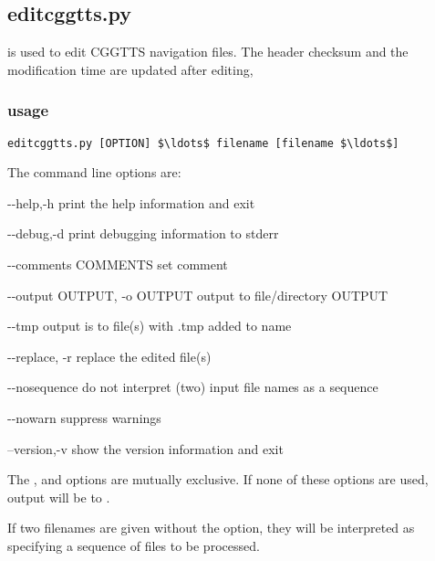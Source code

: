 \subsection{editcggtts.py}

\hypertarget{h:editcggtts}{}

 is used to edit CGGTTS navigation files. 
The header checksum and the modification time are updated after editing, 

\subsubsection{usage}

\begin{lstlisting}[mathescape=true]
editcggtts.py [OPTION] $\ldots$ filename [filename $\ldots$]
\end{lstlisting}
The command line options are:
\begin{description*}
	\item[-{}-help,-h]	print the help information and exit
	\item[-{}-debug,-d]	print debugging information to stderr
	\item[-{}-comments COMMENTS]   set comment
  \item[-{}-output OUTPUT, -o OUTPUT] output to file/directory OUTPUT
  \item[-{}-tmp]    output is to file(s) with .tmp added to name
  \item[-{}-replace, -r]  replace the edited file(s)
  \item[-{}-nosequence]  do not interpret (two) input file names as a sequence
  \item[-{}-nowarn]  suppress warnings
	\item[--version,-v] show the version information and exit
\end{description*}

The ,  and  options are mutually exclusive. 
If none of these options are used, output will be to .

If two filenames are given without the  option, they will be
interpreted as specifying a sequence of files to be processed.
